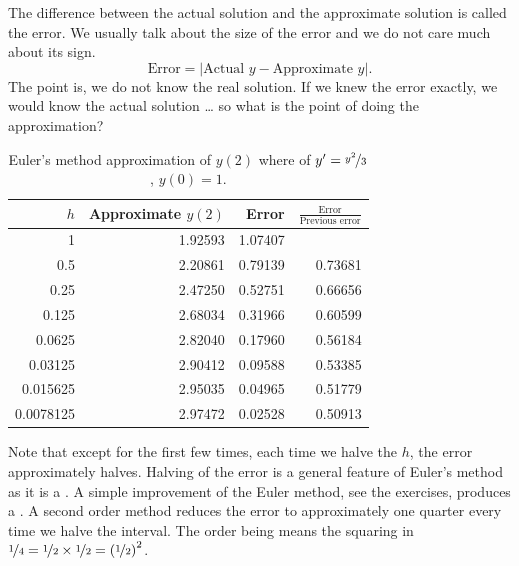 The difference between the actual solution and the approximate solution is
called the error.  We usually talk about the size of the error
and we do not care much about its sign.
\begin{equation*}
\text{Error} = \bigl\lvert \text{Actual } y - \text{Approximate } y
\bigr\rvert .
\end{equation*}
The point is, we
do not know the real solution.
If we knew the error exactly, we would know the actual solution \ldots
so what is the point of doing the approximation?

\begin{table}[h!t]
\mybeginframe
\capstart
\begin{center}
\begin{tabular}{@{}rrrr@{}}
\toprule
$h$ & Approximate $y(2)$ & Error & $\frac{\text{Error}}{\text{Previous error}}$ \\
\midrule
1        & 1.92593 & 1.07407 & \\
0.5      & 2.20861 & 0.79139 & 0.73681 \\
0.25     & 2.47250 & 0.52751 & 0.66656 \\
0.125    & 2.68034 & 0.31966 & 0.60599 \\
0.0625   & 2.82040 & 0.17960 & 0.56184 \\
0.03125  & 2.90412 & 0.09588 & 0.53385 \\
0.015625 & 2.95035 & 0.04965 & 0.51779 \\
0.0078125& 2.97472 & 0.02528 & 0.50913 \\
\bottomrule
\end{tabular}
\end{center}
\caption{Euler's method approximation of $y(2)$ where
of $y'=\nicefrac{y^2}{3}$, $y(0)=1$.\label{euler-table:table}}
\myendframe
\end{table}

Note that except for the first few times, each time we halve 
the $h$, the error approximately halves.
Halving of the error is a general feature of Euler's method as it is a
\emph{}.
A simple improvement of the Euler method, see the exercises,
produces a .
A second order method
reduces the error to approximately one
quarter every time we halve the interval.  The order being
 means the squaring in
$\nicefrac{1}{4} = \nicefrac{1}{2} \times \nicefrac{1}{2}
= {(\nicefrac{1}{2})}^2$.

